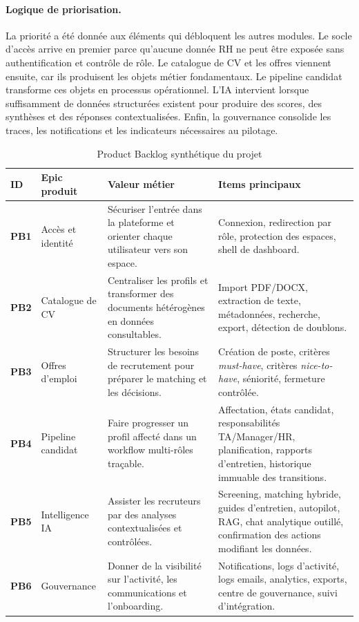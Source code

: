 \paragraph{Logique de priorisation.}
La priorité a été donnée aux éléments qui débloquent les autres modules. Le socle d'accès arrive en premier parce qu'aucune donnée RH ne peut être exposée sans authentification et contrôle de rôle. Le catalogue de CV et les offres viennent ensuite, car ils produisent les objets métier fondamentaux. Le pipeline candidat transforme ces objets en processus opérationnel. L'IA intervient lorsque suffisamment de données structurées existent pour produire des scores, des synthèses et des réponses contextualisées. Enfin, la gouvernance consolide les traces, les notifications et les indicateurs nécessaires au pilotage.

\begin{table}[H]
  \centering
  \caption{\label{tab:product-backlog}Product Backlog synthétique du projet}
  \begin{tabularx}{\textwidth}{>{\bfseries}p{1.2cm}p{3cm}p{3.2cm}X}
    \toprule
    ID & Epic produit & Valeur métier & Items principaux \\
    \midrule
    PB1 & Accès et identité & Sécuriser l'entrée dans la plateforme et orienter chaque utilisateur vers son espace. & Connexion, redirection par rôle, protection des espaces, shell de dashboard. \\
    PB2 & Catalogue de CV & Centraliser les profils et transformer des documents hétérogènes en données consultables. & Import PDF/DOCX, extraction de texte, métadonnées, recherche, export, détection de doublons. \\
    PB3 & Offres d'emploi & Structurer les besoins de recrutement pour préparer le matching et les décisions. & Création de poste, critères \textit{must-have}, critères \textit{nice-to-have}, séniorité, fermeture contrôlée. \\
    PB4 & Pipeline candidat & Faire progresser un profil affecté dans un workflow multi-rôles traçable. & Affectation, états candidat, responsabilités TA/Manager/HR, planification, rapports d'entretien, historique immuable des transitions. \\
    PB5 & Intelligence IA & Assister les recruteurs par des analyses contextualisées et contrôlées. & Screening, matching hybride, guides d'entretien, autopilot, RAG, chat analytique outillé, confirmation des actions modifiant les données. \\
    PB6 & Gouvernance & Donner de la visibilité sur l'activité, les communications et l'onboarding. & Notifications, logs d'activité, logs emails, analytics, exports, centre de gouvernance, suivi d'intégration. \\
    \bottomrule
  \end{tabularx}
\end{table}


